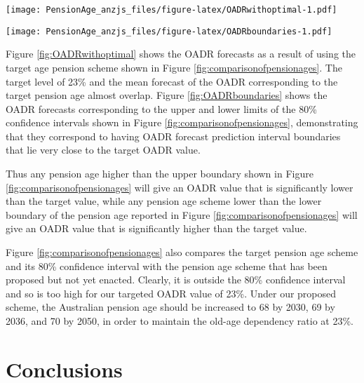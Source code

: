 \documentclass[
  doublespace]{anzsauth}
\let\origfigure\figure
\let\endorigfigure\endfigure
\renewenvironment{figure}[1][2] {
    \expandafter\origfigure\expandafter[tbp]
} {
    \endorigfigure
}
\begin{document}
\begin{figure}
\centering
\texttt{[image: PensionAge\_anzjs\_files/figure-latex/OADRwithoptimal-1.pdf]}
\caption{\label{fig:OADRwithoptimal}The mean forecast and 80\% prediction intervals for the OADR associated with the target pension age scheme shown in blue, along with the desired OADR level in gray.}
\end{figure}

\begin{figure}
\centering
\texttt{[image: PensionAge\_anzjs\_files/figure-latex/OADRboundaries-1.pdf]}
\caption{\label{fig:OADRboundaries}The 80\% prediction intervals of OADR (in blue) associated with the upper and lower boundary of plausible pension age schemes, along with desired OADR level in gray.}
\end{figure}

Figure \ref{fig:OADRwithoptimal} shows the OADR forecasts as a result of using the target age pension scheme shown in Figure \ref{fig:comparisonofpensionages}. The target level of 23\% and the mean forecast of the OADR corresponding to the target pension age almost overlap. Figure \ref{fig:OADRboundaries} shows the OADR forecasts corresponding to the upper and lower limits of the 80\% confidence intervals shown in Figure \ref{fig:comparisonofpensionages}, demonstrating that they correspond to having OADR forecast prediction interval boundaries that lie very close to the target OADR value.

Thus any pension age higher than the upper boundary shown in Figure \ref{fig:comparisonofpensionages} will give an OADR value that is significantly lower than the target value, while any pension age scheme lower than the lower boundary of the pension age reported in Figure \ref{fig:comparisonofpensionages} will give an OADR value that is significantly higher than the target value.

Figure \ref{fig:comparisonofpensionages} also compares the target pension age scheme and its 80\% confidence interval with the pension age scheme that has been proposed but not yet enacted. Clearly, it is outside the 80\% confidence interval and so is too high for our targeted OADR value of 23\%. Under our proposed scheme, the Australian pension age should be increased to 68 by 2030, 69 by 2036, and 70 by 2050, in order to maintain the old-age dependency ratio at 23\%.

\hypertarget{sec:conclusions}{%
\section{Conclusions}\label{sec:conclusions}}
\end{document}
